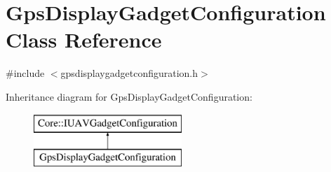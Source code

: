 \hypertarget{class_gps_display_gadget_configuration}{\section{\-Gps\-Display\-Gadget\-Configuration \-Class \-Reference}
\label{class_gps_display_gadget_configuration}
}


{\ttfamily \#include $<$gpsdisplaygadgetconfiguration.\-h$>$}

\-Inheritance diagram for \-Gps\-Display\-Gadget\-Configuration\-:\begin{figure}[H]
\begin{center}
\leavevmode
\includegraphics[height=2.000000cm]{class_gps_display_gadget_configuration}
\end{center}
\end{figure}
